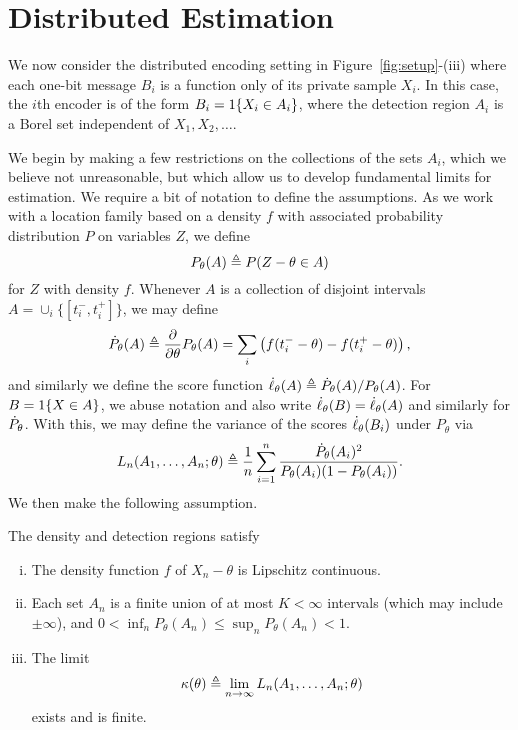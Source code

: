 \section{Distributed Estimation \label{sec:distributed}}

We now consider the distributed encoding setting in
Figure~\ref{fig:setup}-(iii) where each one-bit message $B_i$ is a
function only of its private sample $X_i$. In this case, the $i$th encoder is
of the form $B_i = 1\!\left\{X_i \in A_i\right\}$, where the detection region
$A_i$ is a Borel set independent of $X_1, X_2, \ldots$.

We begin by making a few restrictions on the collections of the sets $A_i$,
which we believe not unreasonable, but which allow us to develop fundamental
limits for estimation.  We require a bit of notation to define the
assumptions. As we work with a location family based on a density $f$
with associated probability distribution $P$ on variables $Z$,
we define
\begin{equation*}
  P_\theta(A) \triangleq P(Z - \theta \in A)
\end{equation*}
for $Z$ with density $f$. Whenever $A$ is a collection
of disjoint intervals $A = \cup_i \{[t_i^-, t_i^+]\}$, we may define
\begin{equation*}
  \dot{P}_\theta(A) \triangleq \frac{\partial}{\partial \theta} P_\theta(A)
  = \sum_i \left(f(t_i^- - \theta) - f(t_i^+ - \theta)\right),
\end{equation*}
and similarly we define the score
function $\dot{\ell}_\theta(A) \triangleq \dot{P}_\theta(A) / P_\theta(A)$.
For $B = 1\!\left\{X \in A\right\}$, we abuse notation and also write
$\dot{\ell}_\theta(B) = \dot{\ell}_\theta(A)$ and similarly for $\dot{P}_\theta$.
With this, we may define the variance of the
scores $\dot{\ell}_\theta(B_i)$ under $P_\theta$ via
\begin{equation}
  \label{eq:precision_general}
  L_n(A_1,\ldots,A_n;\theta) \triangleq
  \frac{1}{n} \sum_{i=1}^n \frac{ \dot{P}_\theta(A_i)^2}{
    P_\theta(A_i) (1 - P_\theta(A_i))}.
\end{equation}
We then make the following assumption.
\begin{assumption}
  \label{assumption:detection-regions}
  The density and detection regions satisfy
  \begin{enumerate}[(i)]
  \item \label{item:density-nice}
    The density function $f$ of $X_n - \theta$ is Lipschitz continuous.
  \item \label{item:finite-intervals}
    Each set $A_n$ is a finite union of at most $K < \infty$ intervals
    (which may include $\pm \infty$), and
    $0 < \inf_n P_\theta(A_n) \le \sup_n P_\theta(A_n) < 1$.
  \item \label{item:limit-variance}
    The limit
    \begin{equation}
      \label{eqn:LAN-limit}
      \kappa(\theta) \triangleq \lim_{n\to \infty} L_n(A_1,\ldots,A_n; \theta)
    \end{equation}
    exists and is finite.
  \end{enumerate}
\end{assumption}

